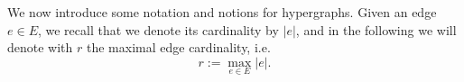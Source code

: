\documentclass[11pt]{article}
\newtheorem{definition}[theorem]{Definition}
\begin{document}
We now introduce some notation and notions for hypergraphs.
Given an edge $e\in E$, we recall that we denote its cardinality by $|e|$, and in the following we will denote with $r$ the maximal edge cardinality, i.e.\
\begin{equation*}
  r:=\max_{e\in E}|e|.
\end{equation*}

\end{document}
